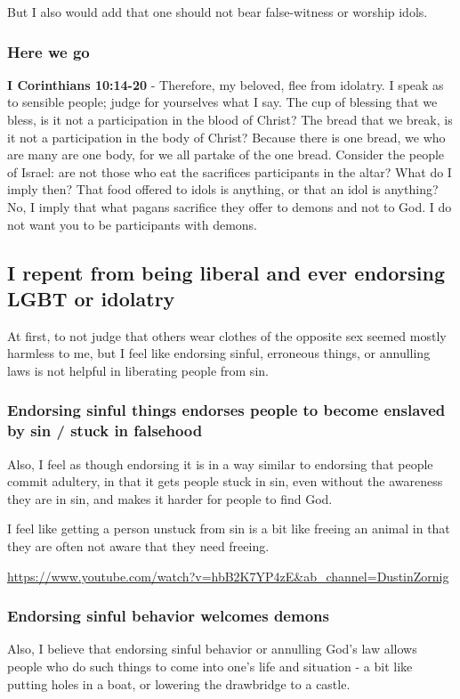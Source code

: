 \documentclass[11pt]{article}
\begin{document}
But I also would add that one should not bear false-witness or worship idols.

\subsubsection{Here we go}
\label{sec:org6a3babc}
\textbf{I Corinthians 10:14-20} - Therefore, my beloved, flee from idolatry.  I speak as to sensible people; judge for yourselves what I say.  The cup of blessing that we bless, is it not a participation in the blood of Christ? The bread that we break, is it not a participation in the body of Christ?  Because there is one bread, we who are many are one body, for we all partake of the one bread.  Consider the people of Israel: are not those who eat the sacrifices participants in the altar?  What do I imply then? That food offered to idols is anything, or that an idol is anything?  No, I imply that what pagans sacrifice they offer to demons and not to God. I do not want you to be participants with demons.

\subsection{I repent from being liberal and ever endorsing LGBT or idolatry}
\label{sec:orgd02418f}
At first, to not judge that others wear
clothes of the opposite sex seemed mostly
harmless to me, but I feel like endorsing
sinful, erroneous things, or annulling laws
is not helpful in liberating people from sin.

\subsubsection{Endorsing sinful things endorses people to become enslaved by sin / stuck in falsehood}
\label{sec:org747e464}
Also, I feel as though endorsing it is in a
way similar to endorsing that people commit
adultery, in that it gets people stuck in sin,
even without the awareness they are in sin,
and makes it harder for people to find God.

I feel like getting a person unstuck from sin
is a bit like freeing an animal in that they
are often not aware that they need freeing.

\url{https://www.youtube.com/watch?v=hbB2K7YP4zE\&ab\_channel=DustinZornig}

\subsubsection{Endorsing sinful behavior welcomes demons}
\label{sec:orgf6a783a}
Also, I believe that endorsing sinful behavior
or annulling God's law allows people who do
such things to come into one's life and
situation - a bit like putting holes in a
boat, or lowering the drawbridge to a castle.
\end{document}

